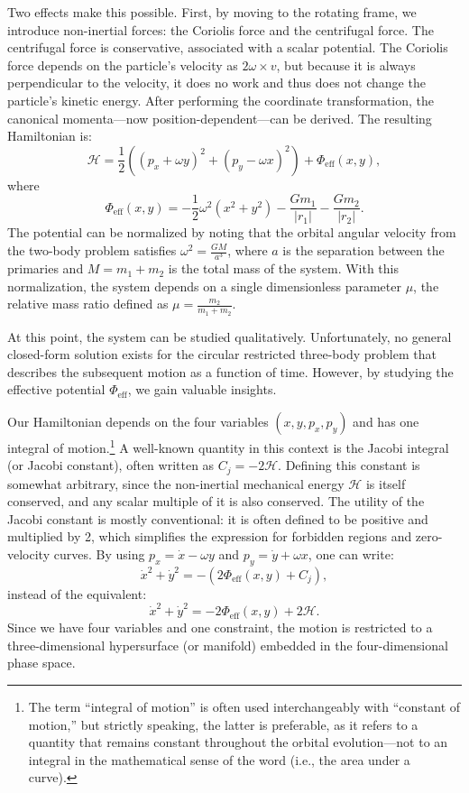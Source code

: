         Two effects make this possible. First, by moving to the rotating frame, we introduce non-inertial forces: the Coriolis force and the centrifugal force. The centrifugal force is conservative, associated with a scalar potential. The Coriolis force depends on the particle's velocity as $2\omega\times v$, but because it is always perpendicular to the velocity, it does no work and thus does not change the particle's kinetic energy. After performing the coordinate transformation, the canonical momenta—now position-dependent—can be derived. The resulting Hamiltonian is:
        \begin{equation}
            \mathcal{H} = \frac{1}{2}\left(\left(p_x + \omega y\right)^2 + \left(p_y - \omega x\right)^2 \right) + \Phi_\mathrm{eff}(x,y),
        \end{equation}
        where
        \begin{equation}
            \Phi_\mathrm{eff}(x,y) = -\frac{1}{2} \omega^2 (x^2 + y^2) - \frac{G m_1}{|r_1|} - \frac{G m_2}{|r_2|}.
        \end{equation}
        The potential can be normalized by noting that the orbital angular velocity from the two-body problem satisfies \(\omega^2 = \frac{G M}{a^3}\), where \(a\) is the separation between the primaries and \(M = m_1 + m_2\) is the total mass of the system. With this normalization, the system depends on a single dimensionless parameter \(\mu\), the relative mass ratio defined as \(\mu = \frac{m_2}{m_1 + m_2}\).

        At this point, the system can be studied qualitatively. Unfortunately, no general closed-form solution exists for the circular restricted three-body problem that describes the subsequent motion as a function of time. However, by studying the effective potential \(\Phi_\mathrm{eff}\), we gain valuable insights.

        Our Hamiltonian depends on the four variables \((x, y, p_x, p_y)\) and has one integral of motion.\footnote{The term ``integral of motion'' is often used interchangeably with ``constant of motion,'' but strictly speaking, the latter is preferable, as it refers to a quantity that remains constant throughout the orbital evolution—not to an integral in the mathematical sense of the word (i.e., the area under a curve).} A well-known quantity in this context is the Jacobi integral (or Jacobi constant), often written as \(C_j = -2\mathcal{H}\). Defining this constant is somewhat arbitrary, since the non-inertial mechanical energy \(\mathcal{H}\) is itself conserved, and any scalar multiple of it is also conserved. The utility of the Jacobi constant is mostly conventional: it is often defined to be positive and multiplied by 2, which simplifies the expression for forbidden regions and zero-velocity curves. By using $p_x = \dot{x}-\omega y$ and $p_y = \dot{y} + \omega x$, one can write:
        \[
        \dot{x}^2 + \dot{y}^2 = - \left(2 \Phi_\mathrm{eff}(x,y) + C_j\right),
        \]
        instead of the equivalent:
        \[
        \dot{x}^2 + \dot{y}^2 = -2 \Phi_\mathrm{eff}(x,y) + 2 \mathcal{H}.
        \]
        Since we have four variables and one constraint, the motion is restricted to a three-dimensional hypersurface (or manifold) embedded in the four-dimensional phase space.

